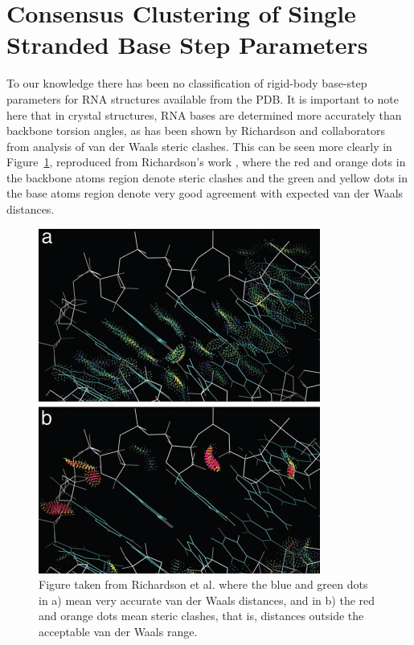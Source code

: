 \section{Consensus Clustering of Single Stranded Base Step Parameters}
To  our  knowledge there  has  been  no  classification of  rigid-body
base-step parameters  for RNA structures available from the PDB.  It is
important  to note  here that  in  crystal structures,  RNA bases  are
determined more  accurately than backbone torsion angles,  as has been
shown by Richardson  and collaborators from analysis of  van der Waals
steric    clashes.    This    can    be   seen    more   clearly    in
Figure~\ref{fig:murray},    reproduced    from    Richardson's    work
\cite{murray2003}, where the red and orange dots in the backbone atoms
region denote steric clashes and the green and yellow dots in the base
atoms region  denote very good  agreement with expected van  der Waals
distances.
\begin{figure}[htbp]
 \centering
 \includegraphics[scale=0.5]{Chapter2/murray2003.png}
 \caption{Figure taken from  Richardson et al. \cite{murray2003} where
 the  blue and  green dots  in  a) mean  very accurate  van der  Waals
 distances, and  in b)  the red and  orange dots mean  steric clashes,
 that is, distances outside the acceptable van der Waals range.}
 \label{fig:murray}
\end{figure}

